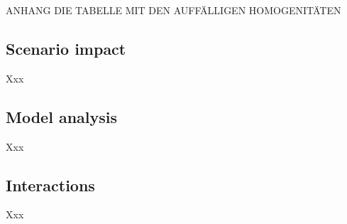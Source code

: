 ANHANG DIE TABELLE MIT DEN AUFFÄLLIGEN HOMOGENITÄTEN

\subsection{Scenario impact}
\label{results:scenarioimpact}
Xxx

\subsection{Model analysis}
\label{results:modelanalysis}
Xxx

\subsection{Interactions}
\label{results:interactions}
Xxx
